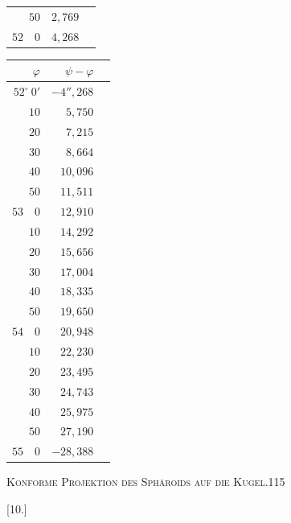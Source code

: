 \begin{center}
\begin{tabular}[t]{|r|r|r|}
$50$&$2{,}769$&\raisebox{-.7\baselineskip}{\small$1{,}499$}\\
$52\quad0$&$4{,}268$&
\end{tabular}\qquad
\begin{tabular}[t]{|r|r|r|}
\hline
$\varphi$&$\psi-\varphi$&\\\hline\hline
$52^\circ\ 0'$&$-4''{,}268$&\raisebox{-.7\baselineskip}{\small$1{,}482$}\\
$10$&$5{,}750$&\raisebox{-.7\baselineskip}{\small$1{,}465$}\\
$20$&$7{,}215$&\raisebox{-.7\baselineskip}{\small$1{,}449$}\\
$30$&$8{,}664$&\raisebox{-.7\baselineskip}{\small$1{,}432$}\\
$40$&$10{,}096$&\raisebox{-.7\baselineskip}{\small$1{,}415$}\\
$50$&$11{,}511$&\raisebox{-.7\baselineskip}{\small$1{,}399$}\\
$53\quad0$&$12{,}910$&\raisebox{-.7\baselineskip}{\small$1{,}382$}\\
$10$&$14{,}292$&\raisebox{-.7\baselineskip}{\small$1{,}364$}\\
$20$&$15{,}656$&\raisebox{-.7\baselineskip}{\small$1{,}348$}\\
$30$&$17{,}004$&\raisebox{-.7\baselineskip}{\small$1{,}331$}\\
$40$&$18{,}335$&\raisebox{-.7\baselineskip}{\small$1{,}315$}\\
$50$&$19{,}650$&\raisebox{-.7\baselineskip}{\small$1{,}298$}\\
$54\quad0$&$20{,}948$&\raisebox{-.7\baselineskip}{\small$1{,}282$}\\
$10$&$22{,}230$&\raisebox{-.7\baselineskip}{\small$1{,}265$}\\
$20$&$23{,}495$&\raisebox{-.7\baselineskip}{\small$1{,}248$}\\
$30$&$24{,}743$&\raisebox{-.7\baselineskip}{\small$1{,}232$}\\
$40$&$25{,}975$&\raisebox{-.7\baselineskip}{\small$1{,}215$}\\
$50$&$27{,}190$&\raisebox{-.7\baselineskip}{\small$1{,}198$}\\
$55\quad0$&$-28{,}388$&
\end{tabular}
\par\endgroup
\end{center}
\clearpage
\noindent\mbox{}\hfill{\small\textsc{Konforme Projektion des Sphäroids auf die Kugel.}}\hfill115\par\bigskip
\begin{center}[10.]\end{center}
